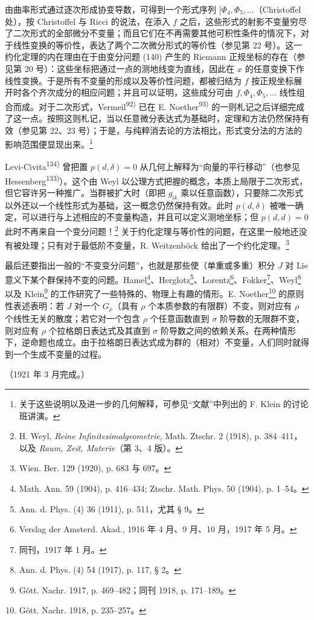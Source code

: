 由曲率形式通过逐次形成协变导数，可得到一个形式序列 $[\Phi_4,\Phi_5,\ldots$（Christoffel 处），按 Christoffel 与 Ricci 的说法，在添入 $f$ 之后，这些形式的射影不变量穷尽了二次形式的全部微分不变量；而且它们在不再需要其他可积性条件的情况下，对于线性变换的等价性，表达了两个二次微分形式的等价性（参见第 22 号）。这一约化定理的内在理由在于由变分问题 (140) 产生的 Riemann 正规坐标的存在（参见第 20 号）：这些坐标把通过一点的测地线变为直线，因此在 $x$ 的任意变换下作线性变换。于是所有不变量的形成以及等价性问题，都被归结为 $f$ 按正规坐标展开时各个齐次成分的相应问题；并且可以证明，这些成分可由 $f,\Phi_4,\Phi_5,\ldots$ 线性组合而成。对于二次形式，Vermeil\textsuperscript{92)} 已在 E. Noether\textsuperscript{93)} 的一则札记之后详细完成了这一点。按照这则札记，当以任意微分表达式为基础时，定理和方法仍然保持有效（参见第 22、23 号）；于是，与纯粹消去论的方法相比，形式变分法的方法的影响范围便显现出来。\footnote{关于这些说明以及进一步的几何解释，可参见“文献”中列出的 F. Klein 的讨论班讲演。}

Levi-Civita\textsuperscript{134)} 曾把置 $p(d,\delta)=0$ 从几何上解释为“向量的平行移动”（也参见 Hessenberg\textsuperscript{133)}）。这个由 Weyl 以公理方式把握的概念，本质上局限于二次形式，但它容许另一种推广。当群被扩大时（即把 $g_{ik}$ 乘以任意函数），只要除二次形式以外还以一个线性形式为基础，这一概念仍然保持有效。此时 $p(d,\delta)$ 被唯一确定，可以进行与上述相应的不变量构造，并且可以定义测地坐标；但 $p(d,d)=0$ 此时不再来自一个变分问题！\footnote{H. Weyl, \emph{Reine Infinitesimalgeometrie}, Math. Ztschr. 2 (1918), p. 384--411，以及 \emph{Raum, Zeit, Materie}（第 3、4 版）。} 关于约化定理与等价性的问题，在这里一般地还没有被处理；只有对于最低阶不变量，R. Weitzenböck 给出了一个约化定理。\footnote{Wien. Ber. 129 (1920), p. 683 与 697。}

最后还要指出一般的“不变变分问题”，也就是那些使（单重或多重）积分 $J$ 对 Lie 意义下某个群保持不变的问题。Hamel\footnote{Math. Ann. 59 (1904), p. 416--434; Ztschr. Math. Phys. 50 (1904), p. 1--54。}、Herglotz\footnote{Ann. d. Phys. (4) 36 (1911), p. 511，尤其 § 9。}、Lorentz\footnote{Verslag der Amsterd. Akad., 1916 年 4 月、9 月、10 月，1917 年 5 月。}、Fokker\footnote{同刊，1917 年 1 月。}、Weyl\footnote{Ann. d. Phys. (4) 54 (1917), p. 117, § 2。} 以及 Klein\footnote{Gött. Nachr. 1917, p. 469--482；同刊 1918, p. 171--189。} 的工作研究了一些特殊的、物理上有趣的情形。E. Noether\footnote{Gött. Nachr. 1918, p. 235--257。} 的原则性表述表明：若 $J$ 对一个 $G_\rho$（具有 $\rho$ 个本质参数的有限群）不变，则对应有 $\rho$ 个线性无关的散度；若它对一个包含 $\rho$ 个任意函数直到 $\sigma$ 阶导数的无限群不变，则对应有 $\rho$ 个拉格朗日表达式及其直到 $\sigma$ 阶导数之间的依赖关系。在两种情形下，逆命题也成立。由于拉格朗日表达式成为群的（相对）不变量，人们同时就得到一个生成不变量的过程。

\begin{center}
（1921 年 3 月完成。）
\end{center}


\clearpage
